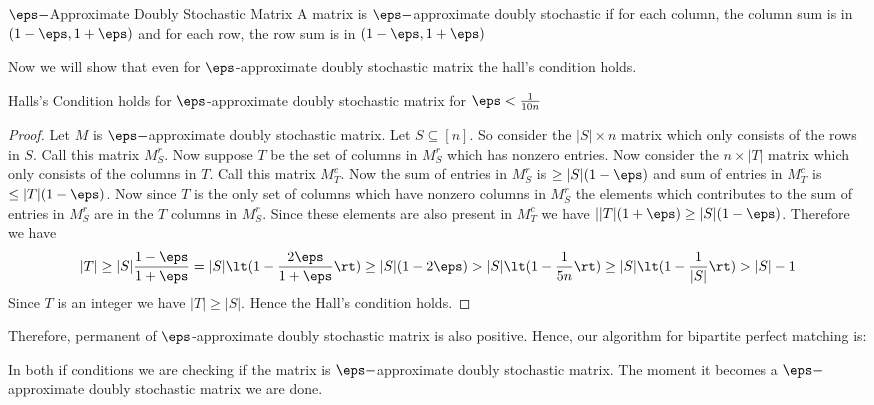 \begin{Definition}{$\eps-$Approximate Doubly Stochastic Matrix}{}
	A  matrix is $\eps-$approximate doubly stochastic if for each column, the column sum is in $(1-\eps,1+\eps)$ and  for each row, the row sum is in $(1-\eps,1+\eps)$
\end{Definition}

Now we will show that even for $\eps$-approximate doubly stochastic matrix the hall's condition holds.
\begin{lemma}{}{}
	Halls's Condition holds for $\eps$-approximate doubly stochastic matrix for $\eps<\frac1{10n}$
\end{lemma}
\begin{proof}
	Let $M$ is $\eps-$approximate doubly stochastic matrix. Let $S\subseteq [n]$. So consider the $|S|\times n$ matrix which only consists of the rows in $S$. Call this matrix $M_S^r$. Now suppose $T$ be the set of columns in $M_S^r$ which has nonzero entries. Now consider the $n\times |T|$ matrix which only consists of the columns in $T$. Call this matrix $M_T^c$. Now the sum of entries in $M_S^r$ is $\geq |S|(1-\eps)$ and sum of entries in $M_T^c$ is $\leq |T|(1-\eps)$. Now since $T$ is the only set of columns which have nonzero columns in $M_S^r$ the elements which contributes to the sum of entries in $M_S^r$ are in the  $T$ columns in $M_S^r$. Since these elements are also present in $M_T^c$ we have $||T|(1+\eps)\geq |S|(1-\eps)$. Therefore we have $$|T|\geq |S|\frac{1-\eps}{1+\eps}=|S|\lt(1-\frac{2\eps}{1+\eps}\rt)\geq |S|(1-2\eps)>|S|\lt(1-\frac1{5n}\rt)\geq |S|\lt(1-\frac1{|S|}\rt)>|S|-1$$Since $T$ is an integer we have $|T|\geq |S|$. Hence the Hall's condition holds.
\end{proof}

Therefore, permanent of $\eps$-approximate doubly stochastic matrix is also positive. Hence, our algorithm for bipartite perfect matching is:
\begin{algorithm}
	\DontPrintSemicolon
	\caption{}
\end{algorithm}


In both if conditions we are checking if the matrix is $\eps-$approximate doubly stochastic matrix. The moment it becomes a $\eps-$approximate doubly stochastic matrix we are done.

